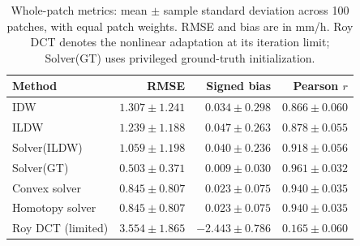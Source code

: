 \begin{table}[H]
\centering\small
\begin{tabular}{lrrr}
\toprule
Method & RMSE & Signed bias & Pearson $r$ \\
\midrule
IDW & $1.307\pm 1.241$ & $0.034\pm 0.298$ & $0.866\pm 0.060$ \\
ILDW & $1.239\pm 1.188$ & $0.047\pm 0.263$ & $0.878\pm 0.055$ \\
Solver(ILDW) & $1.059\pm 1.198$ & $0.040\pm 0.236$ & $0.918\pm 0.056$ \\
Solver(GT) & $0.503\pm 0.371$ & $0.009\pm 0.030$ & $0.961\pm 0.032$ \\
Convex solver & $0.845\pm 0.807$ & $0.023\pm 0.075$ & $0.940\pm 0.035$ \\
Homotopy solver & $0.845\pm 0.807$ & $0.023\pm 0.075$ & $0.940\pm 0.035$ \\
Roy DCT (limited) & $3.554\pm 1.865$ & $-2.443\pm 0.786$ & $0.165\pm 0.060$ \\
\bottomrule
\end{tabular}
\caption{Whole-patch metrics: mean $\pm$ sample standard deviation across 100 patches, with equal patch weights. RMSE and bias are in mm/h. Roy DCT denotes the nonlinear adaptation at its iteration limit; Solver(GT) uses privileged ground-truth initialization.}
\label{tab:patch_map_metrics}
\end{table}